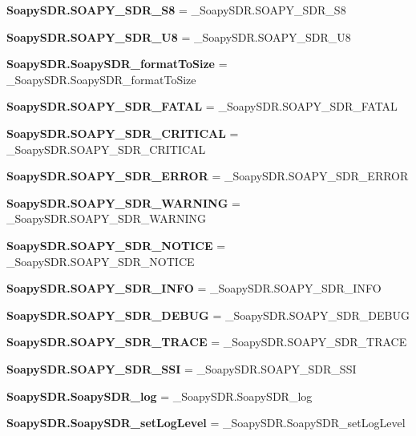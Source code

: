 \begin{DoxyCompactItemize}
\item 
{\bf Soapy\+S\+D\+R.\+S\+O\+A\+P\+Y\+\_\+\+S\+D\+R\+\_\+\+S8} = \+\_\+\+Soapy\+S\+D\+R.\+S\+O\+A\+P\+Y\+\_\+\+S\+D\+R\+\_\+\+S8
\item 
{\bf Soapy\+S\+D\+R.\+S\+O\+A\+P\+Y\+\_\+\+S\+D\+R\+\_\+\+U8} = \+\_\+\+Soapy\+S\+D\+R.\+S\+O\+A\+P\+Y\+\_\+\+S\+D\+R\+\_\+\+U8
\item 
{\bf Soapy\+S\+D\+R.\+Soapy\+S\+D\+R\+\_\+format\+To\+Size} = \+\_\+\+Soapy\+S\+D\+R.\+Soapy\+S\+D\+R\+\_\+format\+To\+Size
\item 
{\bf Soapy\+S\+D\+R.\+S\+O\+A\+P\+Y\+\_\+\+S\+D\+R\+\_\+\+F\+A\+T\+AL} = \+\_\+\+Soapy\+S\+D\+R.\+S\+O\+A\+P\+Y\+\_\+\+S\+D\+R\+\_\+\+F\+A\+T\+AL
\item 
{\bf Soapy\+S\+D\+R.\+S\+O\+A\+P\+Y\+\_\+\+S\+D\+R\+\_\+\+C\+R\+I\+T\+I\+C\+AL} = \+\_\+\+Soapy\+S\+D\+R.\+S\+O\+A\+P\+Y\+\_\+\+S\+D\+R\+\_\+\+C\+R\+I\+T\+I\+C\+AL
\item 
{\bf Soapy\+S\+D\+R.\+S\+O\+A\+P\+Y\+\_\+\+S\+D\+R\+\_\+\+E\+R\+R\+OR} = \+\_\+\+Soapy\+S\+D\+R.\+S\+O\+A\+P\+Y\+\_\+\+S\+D\+R\+\_\+\+E\+R\+R\+OR
\item 
{\bf Soapy\+S\+D\+R.\+S\+O\+A\+P\+Y\+\_\+\+S\+D\+R\+\_\+\+W\+A\+R\+N\+I\+NG} = \+\_\+\+Soapy\+S\+D\+R.\+S\+O\+A\+P\+Y\+\_\+\+S\+D\+R\+\_\+\+W\+A\+R\+N\+I\+NG
\item 
{\bf Soapy\+S\+D\+R.\+S\+O\+A\+P\+Y\+\_\+\+S\+D\+R\+\_\+\+N\+O\+T\+I\+CE} = \+\_\+\+Soapy\+S\+D\+R.\+S\+O\+A\+P\+Y\+\_\+\+S\+D\+R\+\_\+\+N\+O\+T\+I\+CE
\item 
{\bf Soapy\+S\+D\+R.\+S\+O\+A\+P\+Y\+\_\+\+S\+D\+R\+\_\+\+I\+N\+FO} = \+\_\+\+Soapy\+S\+D\+R.\+S\+O\+A\+P\+Y\+\_\+\+S\+D\+R\+\_\+\+I\+N\+FO
\item 
{\bf Soapy\+S\+D\+R.\+S\+O\+A\+P\+Y\+\_\+\+S\+D\+R\+\_\+\+D\+E\+B\+UG} = \+\_\+\+Soapy\+S\+D\+R.\+S\+O\+A\+P\+Y\+\_\+\+S\+D\+R\+\_\+\+D\+E\+B\+UG
\item 
{\bf Soapy\+S\+D\+R.\+S\+O\+A\+P\+Y\+\_\+\+S\+D\+R\+\_\+\+T\+R\+A\+CE} = \+\_\+\+Soapy\+S\+D\+R.\+S\+O\+A\+P\+Y\+\_\+\+S\+D\+R\+\_\+\+T\+R\+A\+CE
\item 
{\bf Soapy\+S\+D\+R.\+S\+O\+A\+P\+Y\+\_\+\+S\+D\+R\+\_\+\+S\+SI} = \+\_\+\+Soapy\+S\+D\+R.\+S\+O\+A\+P\+Y\+\_\+\+S\+D\+R\+\_\+\+S\+SI
\item 
{\bf Soapy\+S\+D\+R.\+Soapy\+S\+D\+R\+\_\+log} = \+\_\+\+Soapy\+S\+D\+R.\+Soapy\+S\+D\+R\+\_\+log
\item 
{\bf Soapy\+S\+D\+R.\+Soapy\+S\+D\+R\+\_\+set\+Log\+Level} = \+\_\+\+Soapy\+S\+D\+R.\+Soapy\+S\+D\+R\+\_\+set\+Log\+Level
\item 

\end{DoxyCompactItemize}

